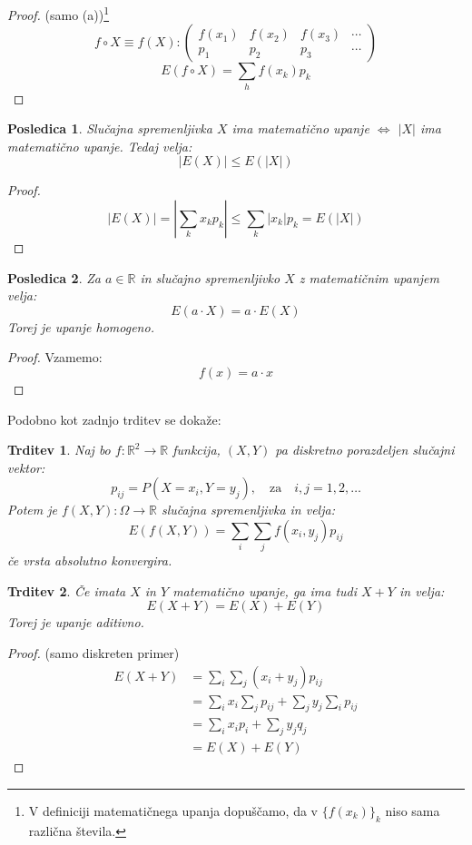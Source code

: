 \documentclass[12pt]{book}
\def\n{\noindent}
\theoremstyle{definition}
\theoremstyle{plain}
\theoremstyle{plain}
\newtheorem{trditev}{Trditev}
\theoremstyle{plain}
\newtheorem{posledica}{Posledica}
\theoremstyle{remark}
\begin{document}
\begin{proof}(samo (a))\footnote[2]{V definiciji matematičnega upanja dopuščamo, da v $\{ f(x_k)\}_k$ niso sama različna števila.}
    $$
    f \circ X \equiv f(X):\left(\begin{array}{cccc}
        f\left(x_1\right) & f\left(x_2\right) & f\left(x_3\right) & \cdots \\
        p_1 & p_2 & p_3 & \cdots
        \end{array}\right)
    $$
    $$
    E(f \circ X)=\sum_h f\left(x_k\right) p_k
    $$
\end{proof}

\begin{posledica}
    Slučajna spremenljivka $X$ ima matematično upanje $\iff$ $|X|$ ima matematično upanje. Tedaj velja: 
    $$
    |E(X)| \leq E(|X|)
    $$
\end{posledica}
    
\begin{proof}
    $$
    |E(X)|=\left|\sum_k x_k  p_k \right| \leq \sum_k\left|x_k\right| p_k = E(|X|)
    $$
\end{proof}

\begin{posledica}
    Za $a \in \mathbb{R}$ in slučajno spremenljivko $X$ z matematičnim upanjem velja: 
    $$
    E(a \cdot X)=a \cdot E(X)
    $$
    Torej je upanje homogeno.
\end{posledica}

\begin{proof}
    Vzamemo: 
    $$
    f(x)=a \cdot x
    $$
\end{proof}

\n Podobno kot zadnjo trditev se dokaže:
\begin{trditev}
    Naj bo $f: \mathbb{R}^2 \to \mathbb{R}$ funkcija, $(X,Y)$ pa diskretno porazdeljen slučajni vektor: 
    $$
    p_{i j}=P\left(X=x_i, Y=y_j\right), \quad \text{za} \quad i, j=1,2, \ldots
    $$
    Potem je $f(X, Y): \Omega \to \mathbb{R}$ slučajna spremenljivka in velja: 
    $$
    E(f(X, Y))=\sum_i \sum_j f\left(x_i, y_j\right)  p_{i j}
    $$
    če vrsta absolutno konvergira.
\end{trditev}

\begin{trditev}
    Če imata $X$ in $Y$ matematično upanje, ga ima tudi $X+Y$ in velja: 
    $$
    E(X+Y)=E(X)+E(Y)
    $$
    Torej je upanje aditivno. 
\end{trditev}

\begin{proof}(samo diskreten primer)
    $$
    \begin{aligned}
        E(X+Y)&=\sum_i \sum_j\left(x_i+y_j\right) p_{i j} \\
        &=\sum_i x_i \sum_j p_{i j}+\sum_j y_j \sum_i p_{i j} \\
        &=\sum_i x_i p_i+\sum_j y_j q_j \\
        &=E(X) + E(Y)
    \end{aligned}
    $$
\end{proof}
\end{document}
